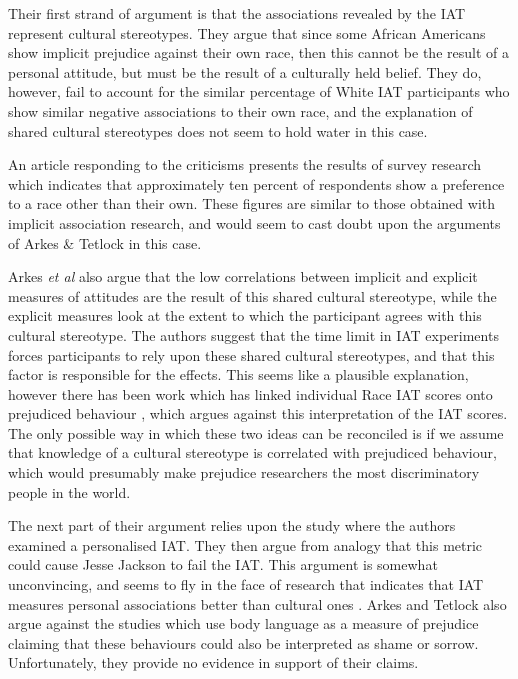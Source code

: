 Their first strand of argument is that the associations revealed by the IAT represent cultural stereotypes. They argue that since some African Americans show implicit prejudice against their own race, then this cannot be the result of a personal attitude, but must be the result of a culturally held belief. They do, however, fail to account for the similar percentage of White IAT participants who show similar negative associations to their own race, and the explanation of shared cultural stereotypes does not seem to hold water in this case. 

An article responding to the criticisms \cite{Sears2004} presents the results of survey research which indicates that approximately ten percent of respondents show a preference to a race other than their own. These figures are similar to those obtained with implicit association research, and would seem to cast doubt upon the arguments of Arkes \& Tetlock in this case. 

Arkes  \textit{et al} also argue that the low correlations between implicit and explicit measures of attitudes are the result of this shared cultural stereotype, while the explicit measures look at the extent to which the participant agrees with this cultural stereotype. The authors suggest that the time limit in IAT experiments forces participants to rely upon these shared cultural stereotypes, and that this factor is responsible for the effects. This seems like a plausible explanation, however there has been work which has linked individual Race IAT scores onto prejudiced behaviour \cite{Heider2007}, which argues against this interpretation of the IAT scores. The only possible way in which these two ideas can be reconciled is if we assume that knowledge of a cultural stereotype is correlated with prejudiced behaviour, which would presumably make prejudice researchers the most discriminatory people in the world. 

The next part of their argument relies upon the \cite{Olson2004} study where the authors examined a  personalised  IAT. They then argue from analogy that this metric could cause Jesse Jackson to fail the IAT. This argument is somewhat unconvincing, and seems to fly in the face of research that indicates that IAT measures personal associations better than cultural ones \cite{Nosek2008a}. Arkes and Tetlock also argue against the studies which use body language as a measure of prejudice  claiming that these behaviours could also be interpreted as shame or sorrow. Unfortunately, they provide no evidence in support of their claims. 

